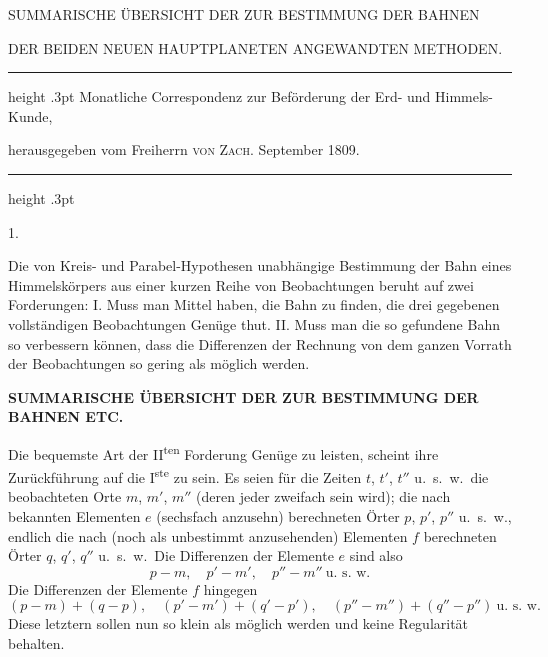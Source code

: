 \noindent\begin{minipage}{\linewidth}
\renewcommand{\thempfootnote}{*)}
\setlength{\parindent}{1.2em}
\begin{center}
{\fontsize{9.7}{12}\selectfont
SUMMARISCHE ÜBERSICHT DER ZUR BESTIMMUNG DER BAHNEN\par
DER BEIDEN NEUEN HAUPTPLANETEN ANGEWANDTEN METHODEN.\par}
\end{center}
\begin{center}
\parbox{.78\linewidth}{%
  \centering\fontsize{8.2}{10.2}\selectfont\frenchspacing
  \hrule height .3pt\relax\vspace{2.5pt}
  Monatliche Correspondenz zur Beförderung der Erd- und Himmels-Kunde,\par
  herausgegeben vom Freiherrn \textsc{von Zach}. September 1809.\par
  \vspace{2.5pt}\hrule height .3pt\relax
}
\end{center}
\begin{center}1.\end{center}
\par\indent Die von Kreis- und Parabel-Hypothesen unabhängige Bestimmung der Bahn eines Himmelskörpers aus einer kurzen Reihe von Beobachtungen beruht auf zwei Forderungen: I. Muss man Mittel haben, die Bahn zu finden, die drei gegebenen vollständigen Beobachtungen Genüge thut. II. Muss man die so gefundene Bahn so verbessern können, dass die Differenzen der Rechnung von dem ganzen Vorrath der Beobachtungen so gering als möglich werden.

\end{minipage}
\par\clearpage
\thispagestyle{empty}
\noindent{}%
\makebox[12mm][l]{}%
\parbox[t]{\dimexpr\linewidth-24mm\relax}{\centering\fontsize{6.9}{9.2}\selectfont\bfseries SUMMARISCHE ÜBERSICHT DER ZUR BESTIMMUNG DER BAHNEN ETC.\par}%
\par\nobreak\smallskip
\indent Die bequemste Art der II\textsuperscript{ten} Forderung Genüge zu leisten, scheint ihre Zurückführung auf die I\textsuperscript{ste} zu sein. Es seien für die Zeiten $t$, $t'$, $t''$ u.\ s.\ w.\ die beobachteten Orte $m$, $m'$, $m''$ (deren jeder zweifach sein wird); die nach bekannten Elementen $e$ (sechsfach anzusehn) berechneten Örter $p$, $p'$, $p''$ u.\ s.\ w., endlich die nach (noch als unbestimmt anzusehenden) Elementen $f$ berechneten Örter $q$, $q'$, $q''$ u.\ s.\ w.\ Die Differenzen der Elemente $e$ sind also
\[
p-m,\quad p'-m',\quad p''-m''\ \text{u.\ s.\ w.}
\]
Die Differenzen der Elemente $f$ hingegen
\[
(p-m)+(q-p),\quad(p'-m')+(q'-p'),\quad(p''-m'')+(q''-p'')\ \text{u.\ s.\ w.}
\]
Diese letztern sollen nun so klein als möglich werden und keine Regularität behalten.

